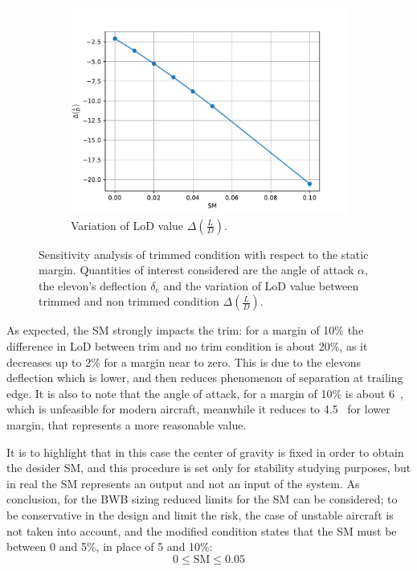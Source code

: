 \begin{figure}[!h]
\begin{subfigure}{0.5\textwidth}
	\end{subfigure}
	\begin{subfigure}{0.5\textwidth}
		\centering
		\includegraphics[keepaspectratio, width=\linewidth]{images/chap4/bwb_static_l2d_var}
		\caption{Variation of LoD value $\Delta\left(\frac{L}{D}\right)$.}
		\label{fig:bwb_static_l2d_var}
	\end{subfigure}
	\caption{Sensitivity analysis of trimmed condition with respect to the static margin. Quantities of interest considered are the angle of attack $\alpha$, the elevon's deflection $\delta_{e}$ and the variation of LoD value between trimmed and non trimmed condition $\Delta\left(\frac{L}{D}\right)$.}
	\label{fig:bwb_static_sensitivity_results}
\end{figure}
As expected, the SM strongly impacts the trim: for a margin of 10\% the difference in LoD between trim and no trim condition is about 20\%, as it decreases up to 2\% for a margin near to zero. 
This is due to the elevons deflection which is lower, and then reduces phenomenon of separation at trailing edge. 
It is also to note that the angle of attack, for a margin of 10\% is about 6~\si{\deg}, which is unfeasible for modern aircraft, meanwhile it reduces to 4.5~\si{\deg} for lower margin, that represents a more reasonable value. 

It is to highlight that in this case the center of gravity is fixed in order to obtain the desider SM, and this procedure is set only for stability studying purposes, but in real the SM represents an output and not an input of the system. 
As conclusion, for the BWB sizing reduced limits for the SM can be considered; to be conservative in the design and limit the risk, the case of unstable aircraft is not taken into account, and the modified condition states that the SM must be between 0 and 5\%, in place of 5 and 10\%:
\begin{equation}
	\label{eq:static_margin_bwb_limit}
	0 \leq \textrm{SM} \leq 0.05
\end{equation}

